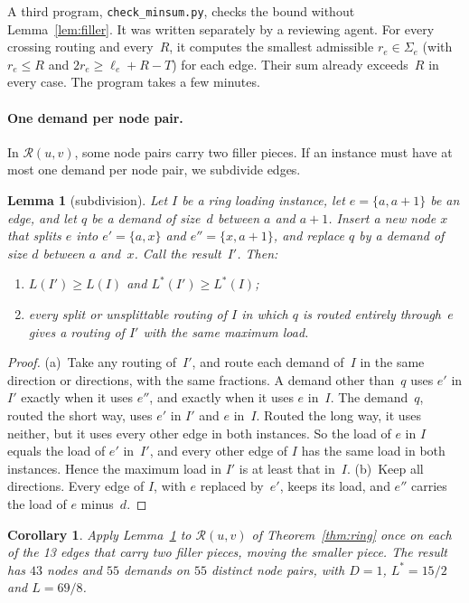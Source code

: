 \documentclass[11pt]{article}
\theoremstyle{plain}
\newtheorem{lemma}[theorem]{Lemma}
\newtheorem{corollary}[theorem]{Corollary}
\theoremstyle{definition}
\theoremstyle{remark}
\begin{document}
A third program, \texttt{check\_minsum.py}, checks the bound without Lemma~\ref{lem:filler}. It was written separately by a reviewing agent.
For every crossing routing and every~$R$, it computes the smallest admissible $r_e\in\Sigma_e$ (with $r_e\le R$ and $2r_e\ge\ell_e+R-T$) for each edge. Their sum already exceeds~$R$ in every case. The program takes a few minutes.

\paragraph{One demand per node pair.}
In $\mathcal{R}(u,v)$, some node pairs carry two filler pieces. If an instance must have at most one demand per node pair, we subdivide edges.

\begin{lemma}[subdivision]\label{lem:sub}
Let $I$ be a ring loading instance, let $e=\{a,a+1\}$ be an edge, and let $q$ be a demand of size~$d$ between $a$ and $a+1$.
Insert a new node $x$ that splits $e$ into $e'=\{a,x\}$ and $e''=\{x,a+1\}$, and replace $q$ by a demand of size $d$ between $a$ and~$x$. Call the result~$I'$. Then:
\begin{enumerate}[label=(\alph*),leftmargin=*]
\item $L(I')\ge L(I)$ and $L^*(I')\ge L^*(I)$;
\item every split or unsplittable routing of $I$ in which $q$ is routed entirely through~$e$ gives a routing of $I'$ with the same maximum load.
\end{enumerate}
\end{lemma}

\begin{proof}
(a)~Take any routing of~$I'$, and route each demand of~$I$ in the same direction or directions, with the same fractions.
A demand other than~$q$ uses $e'$ in $I'$ exactly when it uses $e''$, and exactly when it uses $e$ in~$I$. The demand~$q$, routed the short way, uses $e'$ in $I'$ and $e$ in~$I$. Routed the long way, it uses neither, but it uses every other edge in both instances.
So the load of $e$ in $I$ equals the load of $e'$ in~$I'$, and every other edge of $I$ has the same load in both instances. Hence the maximum load in $I'$ is at least that in~$I$.
(b)~Keep all directions. Every edge of $I$, with $e$ replaced by~$e'$, keeps its load, and $e''$ carries the load of $e$ minus~$d$.
\end{proof}

\begin{corollary}\label{cor:distinct}
Apply Lemma~\ref{lem:sub} to $\mathcal{R}(u,v)$ of Theorem~\ref{thm:ring} once on each of the 13 edges that carry two filler pieces, moving the smaller piece. The result has $43$ nodes and $55$ demands on $55$ distinct node pairs, with $D=1$, $L^*=15/2$ and $L=69/8$.
\end{corollary}
\end{document}
